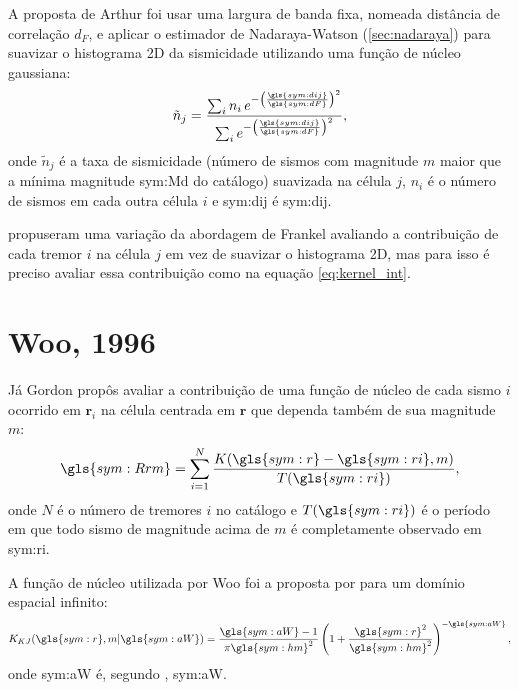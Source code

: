 A proposta de Arthur \citet{frankel_1995} foi usar uma largura de banda fixa, 
nomeada distância de correlação $d_F$, e aplicar o estimador de Nadaraya-Watson (\ref{sec:nadaraya})
para suavizar o histograma 2D da sismicidade utilizando uma função de núcleo gaussiana:
\begin{equation}
	\ensuremath{
		\tilde{n}_j = \frac{ \sum_{i} n_i \,e^{ - \left(\frac{\gls{sym:dij}}{\gls{sym:dF}}\right)^2}}
						   { \sum_{i}     e^{ - \left(\frac{\gls{sym:dij}}{\gls{sym:dF}}\right)^2}},
	}
	\label{eq:ni}
\end{equation}
onde $\tilde{n}_j$ é a taxa de sismicidade (número de sismos com magnitude $m$ maior que a mínima magnitude
\gls{sym:Md} do catálogo) suavizada
na célula $j$, $n_i$ é o número de sismos em cada outra célula $i$ e
	\gls{sym:dij} é \glsdesc{sym:dij}.


\citet{zechar_2010-2} propuseram uma variação da abordagem de Frankel avaliando a contribuição
de cada tremor $i$ na célula $j$ em vez de suavizar o histograma 2D, mas para isso
é preciso avaliar essa contribuição como na equação \eqref{eq:kernel_int}.


\section{Woo, 1996}
\label{sec:woo}

Já Gordon \citet{woo_1996} propôs avaliar a contribuição de uma função de núcleo 
de cada sismo $i$ ocorrido em $\boldsymbol{r}_i$ 
na célula centrada em $\boldsymbol{r}$ que dependa também de sua
magnitude $m$:
\begin{equation}
	\ensuremath{
		\gls{sym:Rrm} = \sum_{i=1}^{N} \frac{ K(\gls{sym:r} - \gls{sym:ri}, m)}
											{T({\gls{sym:ri})}},
	}
	\label{eq:Rrm}
\end{equation}
onde $N$ é o número de tremores $i$ no catálogo 
e $T(\gls{sym:ri})$ é o período em que todo sismo de magnitude acima de $m$ é completamente observado 
em \gls{sym:ri}.

A função de núcleo utilizada por Woo foi a proposta por \citet{kagan_knopoff_1980}
para um domínio espacial infinito:
\begin{equation}
	\ensuremath{
		K_{KJ}(\gls{sym:r}, m \arrowvert \gls{sym:aW}) =  \frac{  \gls{sym:aW}  -1}{\pi\gls{sym:hm}^2}
							\left( 1 + \frac{\gls{sym:r}^2}{\gls{sym:hm}^2} \right)^{-\gls{sym:aW}},
	}
	\label{eq:k_kj}
\end{equation}
onde \gls{sym:aW} é, segundo \citet{verejones_1992}, \glsdesc{sym:aW}.

